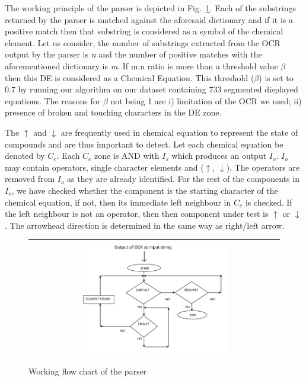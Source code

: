 \documentclass[oneside,a4paper,12pt]{book}
\begin{document}
The working principle of the parser is depicted in Fig.~\ref{flow_chart}.
Each of the substrings returned by the parser is matched against the aforesaid dictionary and if it is a positive match then 
that substring is considered as a symbol of the chemical element. 
Let us consider, the number of substrings extracted from the OCR output by the parser is {\em n}  and the number of positive matches with 
the aforementioned dictionary is {\em m}.
If m:n ratio is more than a threshold value $\beta$ then this DE is considered as a Chemical Equation. 
This threshold ($\beta$) is set to 0.7 by running our algorithm on our dataset containing 733 segmented displayed equations. 
The reasons for $\beta$ not being 1 are
i) limitation of the OCR we used;
ii) presence of broken and touching characters in the DE zone. \par
The $\uparrow$ and $\downarrow$ are frequently used in chemical equation to represent the state of compounds and  are thus important to detect.
Let each chemical equation be denoted by $C_e$. Each $C_e$ zone is AND with $I_s$ which produces an output $I_o$. $I_o$ may contain  operators, single character elements and ($\uparrow$, $\downarrow$). The operators are removed from $I_o$ as they are already identified. For the rest of the components in $I_o$, we have checked whether the component is the starting character of the chemical equation, if not, then its immediate left neighbour in $C_e$ is checked. If the left neighbour is not an operator, then then component under test is  $\uparrow$ or $\downarrow$. The arrowhead direction is determined in the same way as right/left arrow.
\begin{figure}[h]\center\footnotesize
\begin{tabular}{|c|}
\hline
 \includegraphics[width=0.6\textwidth]{flowchart.png} \\ \hline
 \end{tabular} 
 \caption{Working flow chart of the parser}
 \label{flow_chart}
\end{figure}
\end{document}
